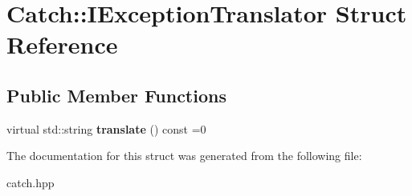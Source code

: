 \hypertarget{struct_catch_1_1_i_exception_translator}{}\section{Catch\+:\+:I\+Exception\+Translator Struct Reference}
\label{struct_catch_1_1_i_exception_translator}
\subsection*{Public Member Functions}
\begin{DoxyCompactItemize}
\item 
\mbox{\label{struct_catch_1_1_i_exception_translator_ade89aa305d8c89576521e76b2d1f82eb}} 
virtual std\+::string {\bfseries translate} () const =0
\end{DoxyCompactItemize}


The documentation for this struct was generated from the following file\+:\begin{DoxyCompactItemize}
\item 
catch.\+hpp\end{DoxyCompactItemize}
